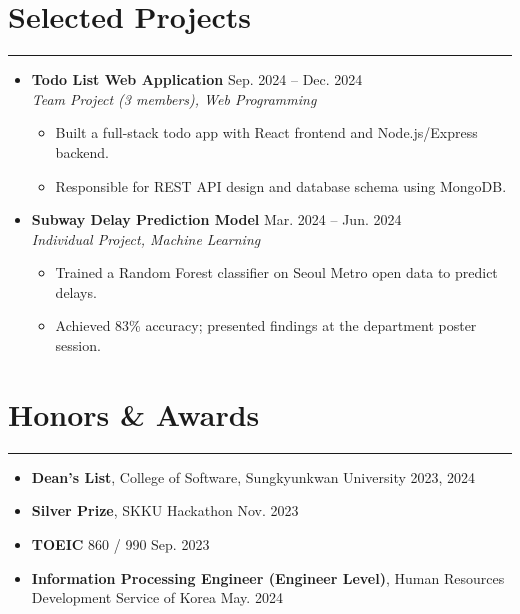 \documentclass[letterpaper, 10pt]{article}
\begin{document}
\section*{Selected Projects}
\hrule
\vspace{4pt}
\begin{itemize}
    \item[]
    \textbf{Todo List Web Application} \hfill Sep. 2024 -- Dec. 2024 \\
    \textit{Team Project (3 members), Web Programming}
    \begin{itemize}
        \item Built a full-stack todo app with React frontend and Node.js/Express backend.
        \item Responsible for REST API design and database schema using MongoDB.
    \end{itemize}
    \item[]
    \textbf{Subway Delay Prediction Model} \hfill Mar. 2024 -- Jun. 2024 \\
    \textit{Individual Project, Machine Learning}
    \begin{itemize}
        \item Trained a Random Forest classifier on Seoul Metro open data to predict delays.
        \item Achieved 83\% accuracy; presented findings at the department poster session.
    \end{itemize}
\end{itemize}

\section*{Honors \& Awards}
\hrule
\vspace{4pt}
\begin{itemize}
    \item \textbf{Dean's List}, College of Software, Sungkyunkwan University \hfill 2023, 2024
    \item \textbf{Silver Prize}, SKKU Hackathon \hfill Nov. 2023
    \item \textbf{TOEIC} 860 / 990 \hfill Sep. 2023
    \item \textbf{Information Processing Engineer (Engineer Level)}, Human Resources Development Service of Korea \hfill May. 2024
\end{itemize}

\end{document}
